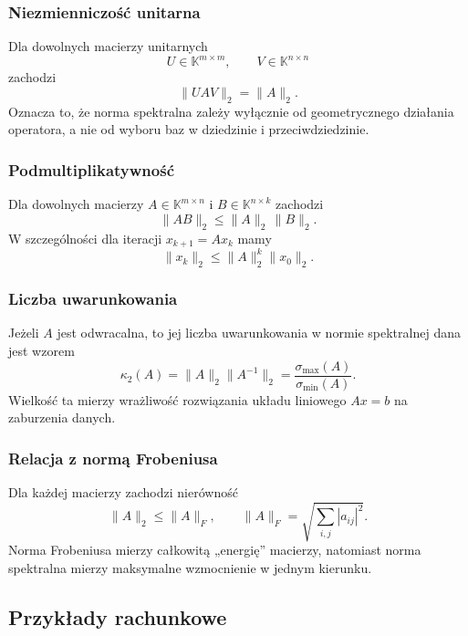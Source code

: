 \documentclass[10pt,a4paper]{article}
\begin{document}
\subsubsection{Niezmienniczość unitarna}

Dla dowolnych macierzy unitarnych
\[
U\in\mathbb{K}^{m\times m},
\qquad
V\in\mathbb{K}^{n\times n}
\]
zachodzi
\[
\|UAV\|_2=\|A\|_2.
\]
Oznacza to, że norma spektralna zależy wyłącznie od geometrycznego działania operatora, a nie od wyboru baz w dziedzinie i przeciwdziedzinie.

\subsubsection{Podmultiplikatywność}

Dla dowolnych macierzy $A\in\mathbb{K}^{m\times n}$ i $B\in\mathbb{K}^{n\times k}$ zachodzi
\[
\|AB\|_2\le\|A\|_2\,\|B\|_2.
\]
W szczególności dla iteracji $x_{k+1}=Ax_k$ mamy
\[
\|x_k\|_2\le\|A\|_2^k\|x_0\|_2.
\]

\subsubsection{Liczba uwarunkowania}

Jeżeli $A$ jest odwracalna, to jej liczba uwarunkowania w normie spektralnej dana jest wzorem
\[
\kappa_2(A)=\|A\|_2\|A^{-1}\|_2
=\frac{\sigma_{\max}(A)}{\sigma_{\min}(A)}.
\]
Wielkość ta mierzy wrażliwość rozwiązania układu liniowego $Ax=b$ na zaburzenia danych.

\subsubsection{Relacja z normą Frobeniusa}

Dla każdej macierzy zachodzi nierówność
\[
\|A\|_2\le\|A\|_F,
\qquad
\|A\|_F=\sqrt{\sum_{i,j}|a_{ij}|^2}.
\]
Norma Frobeniusa mierzy całkowitą „energię” macierzy, natomiast norma spektralna mierzy maksymalne wzmocnienie w jednym kierunku.

\subsection{Przykłady rachunkowe}
\end{document}
